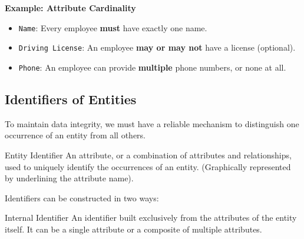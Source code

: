 \vspace{0.2cm}
\begin{example}{\textbf{Example: Attribute Cardinality}}

    \begin{itemize}
    \item \texttt{Name}: Every employee \textbf{must} have exactly one name.
    \item \texttt{Driving License}: An employee \textbf{may or may not} have a license (optional).
    \item \texttt{Phone}: An employee can provide \textbf{multiple} phone numbers, or none at all.
\end{itemize}

\vspace{0.4cm}
\begin{center}
\end{center}

\end{example}

\subsection{Identifiers of Entities}
To maintain data integrity, we must have a reliable mechanism to distinguish one occurrence of an entity from all others.

\begin{defbox}{Entity Identifier}
An attribute, or a combination of attributes and relationships, used to uniquely identify the occurrences of an entity. (Graphically represented by underlining the attribute name).
\end{defbox}

Identifiers can be constructed in two ways:


\begin{defbox}{Internal Identifier}
An identifier built exclusively from the attributes of the entity itself. It can be a single attribute or a composite of multiple attributes.
\end{defbox}

